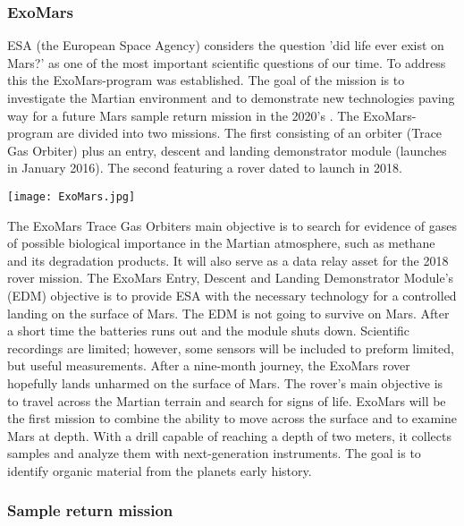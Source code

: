 \begin{multicols}{2}

\subsubsection*{ExoMars}

ESA (the European Space Agency) considers the question 'did life ever exist on Mars?' as one of the most important scientific questions of our time.
To address this the ExoMars-program was established.
The goal of the mission is to investigate the Martian environment and to demonstrate new technologies paving way for a future Mars sample return mission in the 2020’s \cite{FPlan02}. 
The ExoMars-program are divided into two missions.
The first consisting of an orbiter (Trace Gas Orbiter) plus an entry, descent and landing demonstrator module (launches in January 2016).
The second featuring a rover dated to launch in 2018.
 
\begin{center}
	\texttt{[image: ExoMars.jpg]}
\end{center}

The ExoMars Trace Gas Orbiters main objective is to search for evidence of gases of possible biological importance in the Martian atmosphere, such as methane and its degradation products.
It will also serve as a data relay asset for the 2018 rover mission.
The ExoMars Entry, Descent and Landing Demonstrator Module’s (EDM) objective is to provide ESA with the necessary technology for a controlled landing on the surface of Mars.
The EDM is not going to survive on Mars.
After a short time the batteries runs out and the module shuts down.
Scientific recordings are limited; however, some sensors will be included to preform limited, but useful measurements.
After a nine-month journey, the ExoMars rover hopefully lands unharmed on the surface of Mars.
The rover’s main objective is to travel across the Martian terrain and search for signs of life.
ExoMars will be the first mission to combine the ability to move across the surface and to examine Mars at depth.
With a drill capable of reaching a depth of two meters, it collects samples and analyze them with next-generation instruments.
The goal is to identify organic material from the planets early history.

\subsubsection*{Sample return mission}


\end{multicols}

